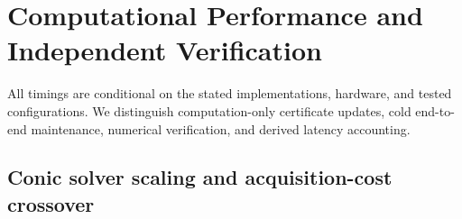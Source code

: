 \documentclass{article}
\theoremstyle{plain}
\theoremstyle{definition}
\begin{document}

\clearpage

\section{Computational Performance and Independent Verification}
\label{app:group-benchmarks}

All timings are conditional on the stated implementations, hardware, and tested configurations. We distinguish computation-only certificate updates, cold end-to-end maintenance, numerical verification, and derived latency accounting.

\subsection{Conic solver scaling and acquisition-cost crossover}
\label{app:conic-compute}
\end{document}
